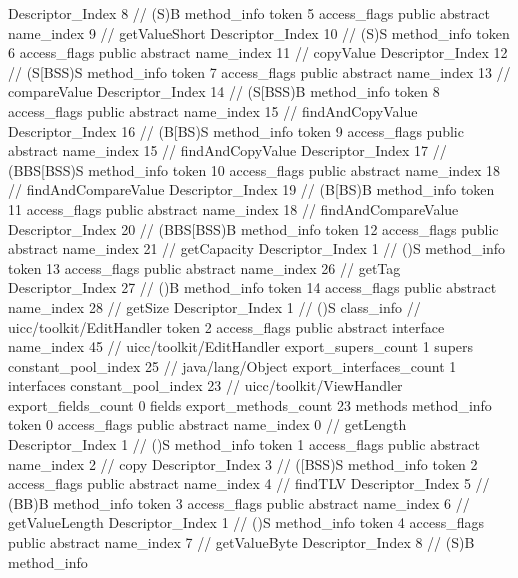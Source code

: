 {{{{{					Descriptor_Index	8		// (S)B
				}
				method_info {
					token	5
					access_flags	public abstract
					name_index	9		// getValueShort
					Descriptor_Index	10		// (S)S
				}
				method_info {
					token	6
					access_flags	public abstract
					name_index	11		// copyValue
					Descriptor_Index	12		// (S[BSS)S
				}
				method_info {
					token	7
					access_flags	public abstract
					name_index	13		// compareValue
					Descriptor_Index	14		// (S[BSS)B
				}
				method_info {
					token	8
					access_flags	public abstract
					name_index	15		// findAndCopyValue
					Descriptor_Index	16		// (B[BS)S
				}
				method_info {
					token	9
					access_flags	public abstract
					name_index	15		// findAndCopyValue
					Descriptor_Index	17		// (BBS[BSS)S
				}
				method_info {
					token	10
					access_flags	public abstract
					name_index	18		// findAndCompareValue
					Descriptor_Index	19		// (B[BS)B
				}
				method_info {
					token	11
					access_flags	public abstract
					name_index	18		// findAndCompareValue
					Descriptor_Index	20		// (BBS[BSS)B
				}
				method_info {
					token	12
					access_flags	public abstract
					name_index	21		// getCapacity
					Descriptor_Index	1		// ()S
				}
				method_info {
					token	13
					access_flags	public abstract
					name_index	26		// getTag
					Descriptor_Index	27		// ()B
				}
				method_info {
					token	14
					access_flags	public abstract
					name_index	28		// getSize
					Descriptor_Index	1		// ()S
				}
			}
		}
		class_info {		// uicc/toolkit/EditHandler
			token	2
			access_flags	public abstract interface
			name_index	45		// uicc/toolkit/EditHandler
			export_supers_count	1
			supers {
				constant_pool_index	25		// java/lang/Object
			}
			export_interfaces_count	1
			interfaces {
				constant_pool_index	23		// uicc/toolkit/ViewHandler
			}
			export_fields_count	0
			fields {
			}
			export_methods_count	23
			methods {
				method_info {
					token	0
					access_flags	public abstract
					name_index	0		// getLength
					Descriptor_Index	1		// ()S
				}
				method_info {
					token	1
					access_flags	public abstract
					name_index	2		// copy
					Descriptor_Index	3		// ([BSS)S
				}
				method_info {
					token	2
					access_flags	public abstract
					name_index	4		// findTLV
					Descriptor_Index	5		// (BB)B
				}
				method_info {
					token	3
					access_flags	public abstract
					name_index	6		// getValueLength
					Descriptor_Index	1		// ()S
				}
				method_info {
					token	4
					access_flags	public abstract
					name_index	7		// getValueByte
					Descriptor_Index	8		// (S)B
				}
				method_info {
}}}}}
